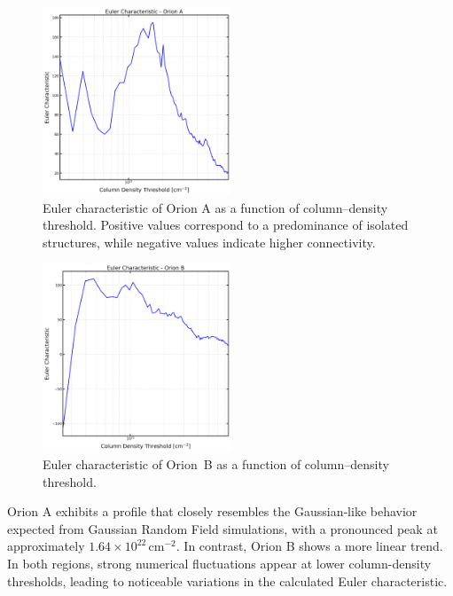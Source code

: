 \begin{figure}[t]
    \centering
    \includegraphics[width=0.5\textwidth]{figures/euler_Orion_A_no_figs.png}
    \caption{Euler characteristic of Orion A as a function of column–density threshold. Positive values correspond to a predominance of isolated structures, while negative values indicate higher connectivity.}
    \label{fig:Euler_Orion_A_no_figs}
\end{figure}

\begin{figure}[t]
    \centering
    \includegraphics[width=0.5\textwidth]{figures/euler_Orion_B_no_figs.png}
    \caption{Euler characteristic of Orion~B as a function of column–density threshold.}
    \label{fig:Euler_Orion_B_no_figs}
\end{figure}

Orion A exhibits a profile that closely resembles the Gaussian‑like behavior expected from Gaussian Random Field simulations, with a pronounced peak at approximately $1.64 \times 10^{22} \,\mathrm{cm}^{-2}$. In contrast, Orion B shows a more linear trend. In both regions, strong numerical fluctuations appear at lower column-density thresholds, leading to noticeable variations in the calculated Euler characteristic.

